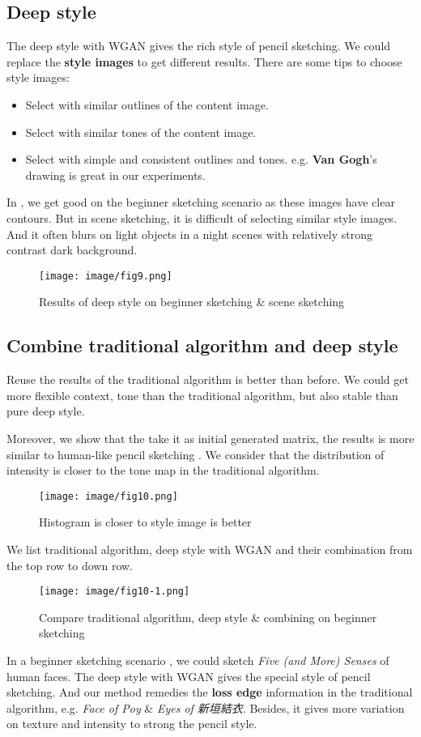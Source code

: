 \subsection{Deep style}
The deep style with WGAN gives the rich style of pencil sketching. We could replace the \textbf{style images} to get different results.
There are some tips to choose style images:
\begin{itemize}
  \item Select with similar outlines of the content image.
  \item Select with similar tones of the content image.
  \item Select with simple and consistent outlines and tones. e.g. \textbf{Van Gogh}'s drawing is great in our experiments.
\end{itemize}
In , we get good on the beginner sketching scenario as these images have clear contours. But in scene sketching, it is difficult of selecting similar style images. And it often blurs on light objects in a night scenes with relatively strong contrast dark background.
\begin{figure}
  \centering
  \texttt{[image: image/fig9.png]}
  \caption{Results of deep style on beginner sketching \& scene sketching}
  \label{fig9}
\end{figure}

\subsection{Combine traditional algorithm and deep style}
Reuse the results of the traditional algorithm is better than before. We could get more flexible context, tone than the traditional algorithm, but also stable than pure deep style.

Moreover, we show that the take it as initial generated matrix, the results is more similar to human-like pencil sketching . We consider that the distribution of intensity is closer to the tone map in the traditional algorithm.
\begin{figure}
  \centering
  \texttt{[image: image/fig10.png]}
  \caption{Histogram is closer to style image is better}
  \label{fig10}
\end{figure}

We list traditional algorithm, deep style with WGAN and their combination from the top row to down row.
\begin{figure}
  \centering
  \texttt{[image: image/fig10-1.png]}
  \caption{Compare traditional algorithm, deep style \& combining on beginner sketching}
  \label{fig10-1}
\end{figure}
In a beginner sketching scenario , we could sketch \textit{Five (and More) Senses} of human faces.
The deep style with WGAN gives the special style of pencil sketching.
And our method remedies the \textbf{loss edge} information in the traditional algorithm, e.g. \textit{Face of Poy} \& \textit{Eyes of 新垣結衣}. Besides, it gives more variation on texture and intensity to strong the pencil style.

